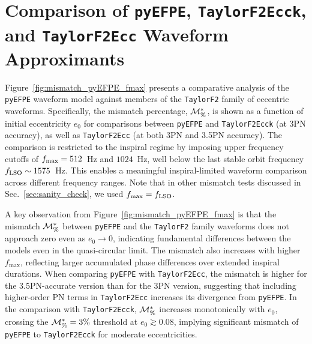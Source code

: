 \documentclass[aps,prd,twocolumn,superscriptaddress,groupedaddress,nofootinbib,showpacs,eqsecnum,useAms]{revtex4-2}
\begin{document}
\section{Comparison of \texttt{pyEFPE}, \texttt{TaylorF2Ecck}, and \texttt{TaylorF2Ecc} Waveform Approximants}
\label{sec:comparison_pyefpe_taylorf2_family}

Figure~\ref{fig:mismatch_pyEFPE_fmax} presents a comparative analysis of the \texttt{pyEFPE} waveform model against members of the \texttt{TaylorF2} family of eccentric waveforms. Specifically, the mismatch percentage, ${\cal M}^*_{\%}$, is shown as a function of initial eccentricity $e_0$ for comparisons between \texttt{pyEFPE} and \texttt{TaylorF2Ecck} (at 3PN accuracy), as well as \texttt{TaylorF2Ecc} (at both 3PN and 3.5PN accuracy). The comparison is restricted to the inspiral regime by imposing upper frequency cutoffs of $f_{\rm max} = 512$~Hz and $1024$~Hz, well below the last stable orbit frequency $f_{\rm LSO} \sim 1575$~Hz. This enables a meaningful inspiral-limited waveform comparison across different frequency ranges. Note that in other mismatch tests discussed in Sec.~\ref{sec:sanity_check}, we used $f_{\rm max} = f_{\rm LSO}$.

A key observation from Figure~\ref{fig:mismatch_pyEFPE_fmax} is that the mismatch ${\cal M}^*_{\%}$ between \texttt{pyEFPE} and the \texttt{TaylorF2} family waveforms does not approach zero even as $e_0 \to 0$, indicating fundamental differences between the models even in the quasi-circular limit. The mismatch also increases with higher $f_{\text{max}}$, reflecting larger accumulated phase differences over extended inspiral durations. When comparing \texttt{pyEFPE} with \texttt{TaylorF2Ecc}, the mismatch is higher for the 3.5PN-accurate version than for the 3PN version, suggesting that including higher-order PN terms in \texttt{TaylorF2Ecc} increases its divergence from \texttt{pyEFPE}. In the comparison with \texttt{TaylorF2Ecck}, ${\cal M}^*_{\%}$ increases monotonically with $e_0$, crossing the ${\cal M}^*_{\%} = 3\%$ threshold at $e_0 \gtrsim 0.08$, implying significant mismatch of \texttt{pyEFPE} to \texttt{TaylorF2Ecck} for moderate eccentricities.
\end{document}
